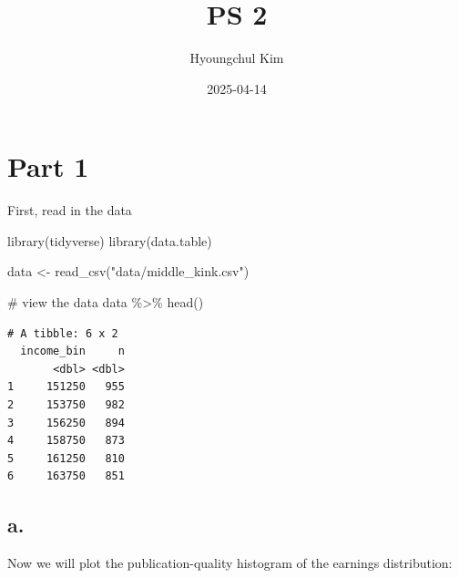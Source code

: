 \documentclass[
  letterpaper,
  DIV=11,
  numbers=noendperiod]{scrartcl}
\title{PS 2}
\author{Hyoungchul Kim}
\date{2025-04-14}
\newenvironment{Shaded}{\begin{snugshade}}{\end{snugshade}}
\newcommand{\CommentTok}[1]{\textcolor[rgb]{0.37,0.37,0.37}{#1}}
\newcommand{\FunctionTok}[1]{\textcolor[rgb]{0.28,0.35,0.67}{#1}}
\newcommand{\NormalTok}[1]{\textcolor[rgb]{0.00,0.23,0.31}{#1}}
\newcommand{\OtherTok}[1]{\textcolor[rgb]{0.00,0.23,0.31}{#1}}
\newcommand{\SpecialCharTok}[1]{\textcolor[rgb]{0.37,0.37,0.37}{#1}}
\newcommand{\StringTok}[1]{\textcolor[rgb]{0.13,0.47,0.30}{#1}}
\begin{document}
\maketitle


\section{Part 1}\label{part-1}

First, read in the data

\begin{Shaded}
\begin{Highlighting}[]
\FunctionTok{library}\NormalTok{(tidyverse)}
\FunctionTok{library}\NormalTok{(data.table)}

\NormalTok{data }\OtherTok{\textless{}{-}} \FunctionTok{read\_csv}\NormalTok{(}\StringTok{"data/middle\_kink.csv"}\NormalTok{)}

\CommentTok{\# view the data}
\NormalTok{data }\SpecialCharTok{\%\textgreater{}\%} \FunctionTok{head}\NormalTok{()}
\end{Highlighting}
\end{Shaded}

\begin{verbatim}
# A tibble: 6 x 2
  income_bin     n
       <dbl> <dbl>
1     151250   955
2     153750   982
3     156250   894
4     158750   873
5     161250   810
6     163750   851
\end{verbatim}

\subsection{a.}\label{a.}

Now we will plot the publication-quality histogram of the earnings
distribution:
\end{document}
